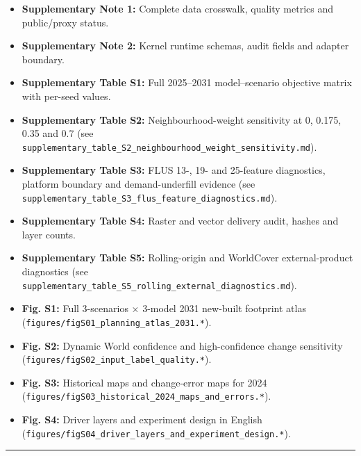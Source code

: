 \begin{itemize}
\tightlist
\item
  \textbf{Supplementary Note 1:} Complete data crosswalk, quality
  metrics and public/proxy status.
\item
  \textbf{Supplementary Note 2:} Kernel runtime schemas, audit fields
  and adapter boundary.
\item
  \textbf{Supplementary Table S1:} Full 2025--2031 model--scenario
  objective matrix with per-seed values.
\item
  \textbf{Supplementary Table S2:} Neighbourhood-weight sensitivity at
  0, 0.175, 0.35 and 0.7 (see
  \texttt{supplementary\_table\_S2\_neighbourhood\_weight\_sensitivity.md}).
\item
  \textbf{Supplementary Table S3:} FLUS 13-, 19- and 25-feature
  diagnostics, platform boundary and demand-underfill evidence (see
  \texttt{supplementary\_table\_S3\_flus\_feature\_diagnostics.md}).
\item
  \textbf{Supplementary Table S4:} Raster and vector delivery audit,
  hashes and layer counts.
\item
  \textbf{Supplementary Table S5:} Rolling-origin and WorldCover
  external-product diagnostics (see
  \texttt{supplementary\_table\_S5\_rolling\_external\_diagnostics.md}).
\item
  \textbf{Fig. S1:} Full 3-scenarios × 3-model 2031 new-built footprint
  atlas (\texttt{figures/figS01\_planning\_atlas\_2031.*}).
\item
  \textbf{Fig. S2:} Dynamic World confidence and high-confidence change
  sensitivity (\texttt{figures/figS02\_input\_label\_quality.*}).
\item
  \textbf{Fig. S3:} Historical maps and change-error maps for 2024
  (\texttt{figures/figS03\_historical\_2024\_maps\_and\_errors.*}).
\item
  \textbf{Fig. S4:} Driver layers and experiment design in English
  (\texttt{figures/figS04\_driver\_layers\_and\_experiment\_design.*}).
\end{itemize}

\begin{center}\rule{0.5\linewidth}{0.5pt}\end{center}
